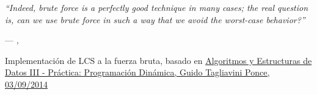 \epigraph{\textit{``Indeed, brute force is a perfectly good technique in many cases; the real question is, can we use brute force in such a way that we avoid the worst-case behavior?''}}{--- \citeauthor{taocv3}, \citeyear{taocv3} \cite{taocv3}}

\begin{algorithm}[H]
    
    \DontPrintSemicolon
    \footnotesize


    \caption{Implementación de LCS a la fuerza bruta, basado en \href{https://www.cubawiki.com.ar/images/1/1a/Lcs_tagliavini.pdf}{Algoritmos y Estructuras de Datos III - Práctica: Programación Dinámica, Guido Tagliavini Ponce, 03/09/2014}}
    \label{alg:mi_algoritmo_1}
\end{algorithm}

